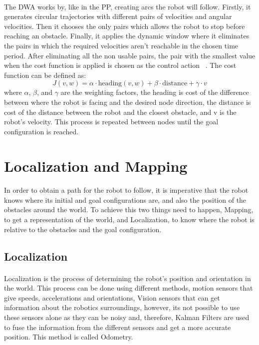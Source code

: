 \paragraph{}The \gls{DWA} works by, like in the \gls{PP}, creating arcs the robot will follow. Firstly, it generates 
circular trajectories with different pairs of velocities and angular velocities. Then it chooses 
the only pairs which allows the robot to stop before reaching an obstacle. Finally, it applies the 
dynamic window where it eliminates the pairs in which the required velocities aren't reachable in the 
chosen time period. After eliminating all the non usable pairs, the pair with the smallest value 
when the cost function is applied is chosen as the control action ~\cite{DWAT}. The cost function can be defined as:
\begin{equation}
    J(v, w) = \alpha \cdot \text{heading}(v, w) + \beta \cdot \text{distance} + \gamma \cdot v
\end{equation}
where $\alpha$, $\beta$, and $\gamma$ are the weighting factors, the heading is cost of the difference between where the robot 
is facing and the desired node direction, the distance is cost of the distance between the robot and the closest obstacle, and v is the
 robot's velocity. This process is repeated between nodes until the goal configuration is reached.


\section{Localization and Mapping}
\label{sec:LM}
\paragraph{}In order to obtain a path for the robot to follow, it is imperative that the robot knows 
where its initial and goal configurations are, and also the position of the obstacles around the world. 
To achieve this two things need to happen, Mapping, to get a representation of the world, and 
Localization, to know where the robot is relative to the obstacles and the goal configuration. 
\subsection{Localization}
\label{subsec:Localization}
\paragraph{}Localization is the process of determining the robot's position and orientation in the world. 
This process can be done using different methods, motion sensors that give speeds, accelerations and orientations, Vision sensors that can 
get information about the robotics surroundings, however, its not possible to use these sensors alone as 
they can be noisy \cite{loc1} and, therefore, Kalman Filters are used to fuse the information from the 
different sensors and get a more accurate position. This method is called Odometry.
